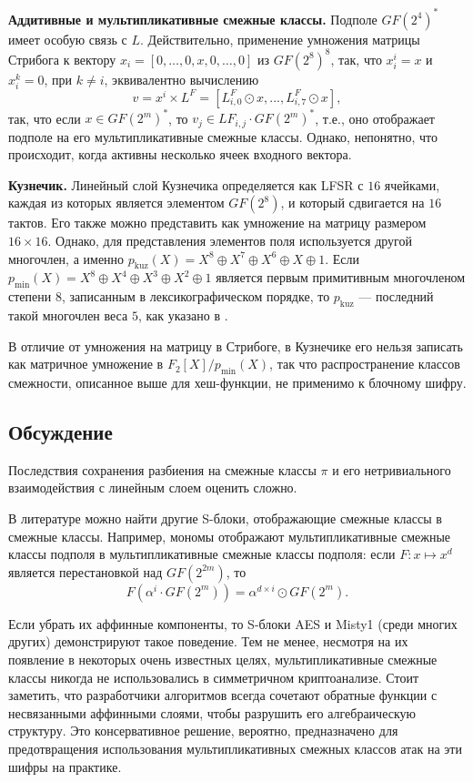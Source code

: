 \textbf{Аддитивные и мультипликативные смежные классы.} Подполе $GF(2^4)^*$ имеет особую связь с $L$. Действительно, применение умножения матрицы Стрибога к вектору \(x_i = [0, \ldots, 0, x, 0, \ldots, 0]\) из $GF(2^8)^8$, так, что \(x_i^i = x\) и \(x_i^k = 0\), при \(k \neq i\), эквивалентно вычислению
\[
v = x^i \times L^F = [L^F_{i,0} \odot x, ..., L^F_{i,7} \odot x],
\]
так, что если \(x \in GF(2^m)^*\), то \(v_j \in LF_{i,j} \cdot GF(2^m)^*\), т.е., оно отображает подполе на его мультипликативные смежные классы. Однако, непонятно, что происходит, когда активны несколько ячеек входного вектора.

\textbf{Кузнечик.} Линейный слой Кузнечика определяется как LFSR с $16$ ячейками, каждая из которых является элементом $GF(2^8)$, и который сдвигается на $16$ тактов. Его также можно представить как умножение на матрицу размером $16 \times 16$. Однако, для представления элементов поля используется другой многочлен, а именно \(p_{\text{kuz}}(X) = X^8 \oplus X^7 \oplus X^6 \oplus X \oplus 1\). Если \(p_{\text{min}}(X) = X^8 \oplus X^4 \oplus X^3 \oplus X^2 \oplus 1\) является первым примитивным многочленом степени $8$, записанным в лексикографическом порядке, то \(p_{\text{kuz}}\) — последний такой многочлен веса $5$, как указано в \cite{LN97}.

В отличие от умножения на матрицу в Стрибоге, в Кузнечике его нельзя записать как матричное умножение в $F_2[X]/p_{\text{min}}(X)$, так что распространение классов смежности, описанное выше для хеш-функции, не применимо к блочному шифру.

\subsection{Обсуждение}

Последствия сохранения разбиения на смежные классы \(\pi\) и его нетривиального взаимодействия с линейным слоем оценить сложно.

В литературе можно найти другие S-блоки, отображающие смежные классы в смежные классы. Например, мономы отображают мультипликативные смежные классы подполя в мультипликативные смежные классы подполя: если \(F: x \mapsto x^d\) является перестановкой над $GF(2^{2m})$, то
\[
F(\alpha^i \cdot GF(2^m)) = \alpha^{d \times i} \odot GF(2^m).
\]

Если убрать их аффинные компоненты, то S-блоки AES \cite{AES01} и Misty1 \cite{Mat97} (среди многих других) демонстрируют такое поведение. Тем не менее, несмотря на их появление в некоторых очень известных целях, мультипликативные смежные классы никогда не использовались в симметричном криптоанализе. Стоит заметить, что разработчики алгоритмов всегда сочетают обратные функции с несвязанными аффинными слоями, чтобы разрушить его алгебраическую структуру. Это консервативное решение, вероятно, предназначено для предотвращения использования мультипликативных смежных классов атак на эти шифры на практике.

